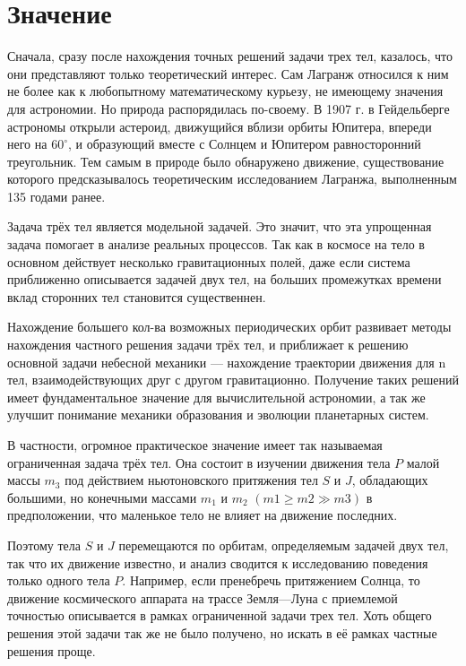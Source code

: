 \documentclass[a4paper, 12pt]{article}%
\begin{document}
\section{Значение}
Сначала, сразу после нахождения точных решений задачи трех тел, казалось, что они представляют только теоретический интерес. Сам Лагранж относился к ним не более как к любопытному математическому курьезу, не имеющему значения для астрономии. Но природа распорядилась по-своему. В 1907 г. в Гейдельберге астрономы открыли астероид, движущийся вблизи орбиты Юпитера, впереди него на $60^{\circ}$, и образующий вместе с Солнцем и Юпитером равносторонний треугольник. Тем самым в природе было обнаружено движение, существование которого предсказывалось теоретическим исследованием Лагранжа, выполненным 135 годами ранее.

Задача трёх тел является модельной задачей. Это значит, что эта упрощенная задача помогает в анализе реальных процессов. Так как в космосе на тело в основном действует несколько гравитационных полей, даже если система приближенно описывается задачей двух тел, на больших промежутках времени вклад сторонних тел становится существеннен. 

Нахождение большего кол-ва возможных периодических орбит развивает методы нахождения частного решения задачи трёх тел, и приближает к решению основной задачи небесной механики --- нахождение траектории движения для n тел, взаимодействующих друг с другом гравитационно. Получение таких решений имеет фундаментальное значение для вычислительной астрономии, а так же улучшит понимание механики образования и эволюции планетарных систем. 

В частности, огромное практическое значение имеет так называемая ограниченная задача трёх тел.  Она состоит в изучении движения тела $P$ малой массы $m_3$ под действием ньютоновского притяжения тел $S$ и $J$, обладающих большими, но конечными массами $m_1$ и $m_2$ $(m1 \geq m2 \gg m3)$ в предположении, что маленькое тело не влияет на движение последних. 

Поэтому тела $S$ и $J$ перемещаются по орбитам, определяемым задачей двух тел, так что их движение известно, и анализ сводится к исследованию поведения только одного тела $P$. Например, если пренебречь притяжением Солнца, то движение космического аппарата на трассе Земля—Луна с приемлемой точностью описывается в рамках ограниченной задачи
трех тел. Хоть общего решения этой задачи так же не было получено, но искать в её рамках частные решения проще. 
\end{document}
